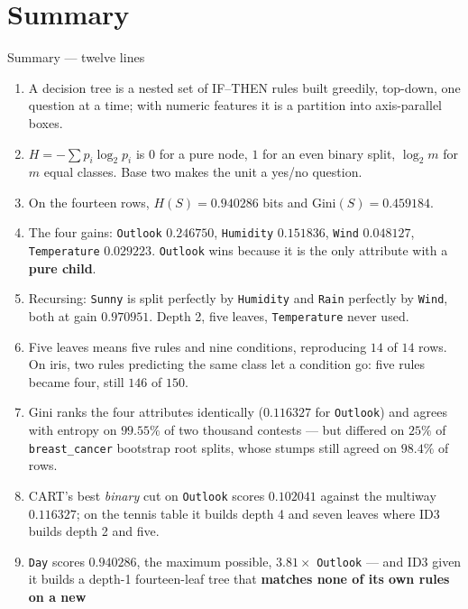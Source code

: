 \documentclass[aspectratio=169]{beamer}
\begin{document}
\section{Summary}
\label{sec:summary}

\begin{frame}[shrink=17]{Summary --- twelve lines}
  \begin{enumerate}\small
    \item A decision tree is a nested set of IF--THEN rules built greedily,
      top-down, one question at a time; with numeric features it is a
      partition into axis-parallel boxes.
    \item $H = -\sum p_i \log_2 p_i$ is $0$ for a pure node, $1$ for an even
      binary split, $\log_2 m$ for $m$ equal classes. Base two makes the unit
      a yes/no question.
    \item On the fourteen rows, $H(S) = \mathbf{0.940286}$ bits and
      $\mathrm{Gini}(S) = 0.459184$.
    \item The four gains: \texttt{Outlook} $\mathbf{0.246750}$,
      \texttt{Humidity} $0.151836$, \texttt{Wind} $0.048127$,
      \texttt{Temperature} $0.029223$. \texttt{Outlook} wins because it is
      the only attribute with a \textbf{pure child}.
    \item Recursing: \texttt{Sunny} is split perfectly by \texttt{Humidity}
      and \texttt{Rain} perfectly by \texttt{Wind}, both at gain $0.970951$.
      Depth 2, five leaves, \texttt{Temperature} never used.
    \item Five leaves means five rules and nine conditions, reproducing
      $14$ of $14$ rows. On iris, two rules predicting the same class let a
      condition go: five rules became four, still $146$ of $150$.
    \item Gini ranks the four attributes identically ($0.116327$ for
      \texttt{Outlook}) and agrees with entropy on $\mathbf{99.55\%}$ of two
      thousand contests --- but differed on $25\%$ of \texttt{breast\_cancer}
      bootstrap root splits, whose stumps still agreed on $98.4\%$ of rows.
    \item CART's best \emph{binary} cut on \texttt{Outlook} scores
      $0.102041$ against the multiway $0.116327$; on the tennis table it
      builds depth 4 and seven leaves where ID3 builds depth 2 and five.
    \item \texttt{Day} scores $\mathbf{0.940286}$, the maximum possible,
      $3.81\times$ \texttt{Outlook} --- and ID3 given it builds a depth-1
      fourteen-leaf tree that \textbf{matches none of its own rules on a new
}
\end{enumerate}
\end{frame}
\end{document}
